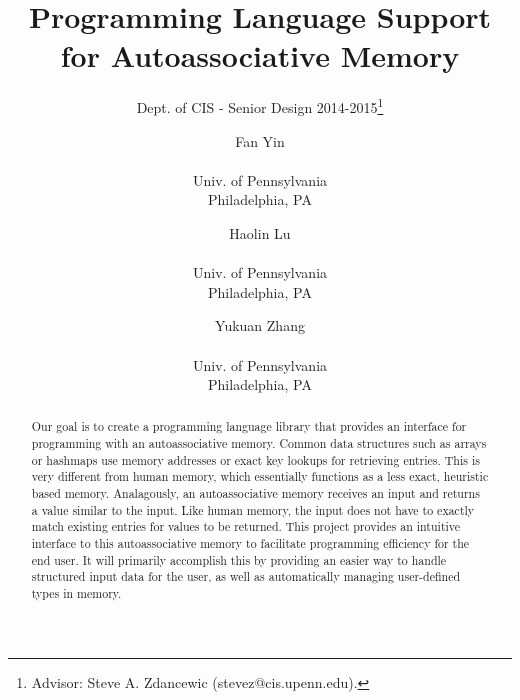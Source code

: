 \documentclass{sig-alternate}
\begin{document}
 

\title{Programming Language Support for Autoassociative Memory}
\subtitle{Dept. of CIS - Senior Design 2014-2015\thanks{Advisor: Steve A. Zdancewic (stevez@cis.upenn.edu).}}
\author{
    Fan Yin \\  \\Univ. of Pennsylvania \\ Philadelphia, PA
    \and Haolin Lu \\  \\Univ. of Pennsylvania \\ Philadelphia, PA
    \and Yukuan Zhang\\  \\Univ. of Pennsylvania \\ Philadelphia, PA
}
%
%
\date{}
\maketitle


\begin{abstract}
    Our goal is to create a programming language library that provides an interface
    for programming with an autoassociative memory. Common data structures such as 
    arrays or hashmaps use memory addresses or exact key lookups for retrieving entries.
    This is very different from human memory, which essentially functions as a less exact, heuristic
    based memory. Analagously, an autoassociative memory receives an input and returns a value similar to the input. Like human memory, the input does not have to exactly match existing entries
    for values to be returned. This project provides an intuitive interface to this autoassociative memory to facilitate programming efficiency for the end user. It will primarily
    accomplish this by providing an easier way to handle structured input data for the user, as well
    as automatically managing user-defined types in memory.
\end{abstract}
\end{document}
